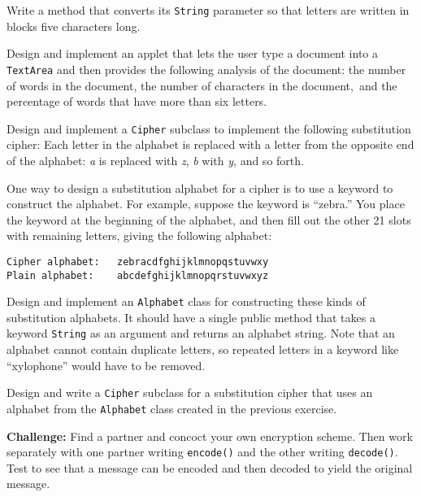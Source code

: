 \begin{EXRtwo}
\noindent Write a method that converts its {\tt String}
parameter so that letters are written in blocks five characters long.

\item  Design and implement an applet that lets the user type a document
into a {\tt TextArea} and then provides the following analysis of the
document: the number of words in the document, the number of
characters in the document,~and the percentage of words that have more
than six letters.

\item  Design and implement a {\tt Cipher} subclass to
implement the following substitution cipher: Each letter in the alphabet
is replaced with a letter from the opposite end of the alphabet:
{\it a} is replaced with {\it z}, {\it b} with {\it y}, and so forth.

\item  One way to design a substitution alphabet for a cipher
is to use a keyword to construct the alphabet.  For example,
suppose the keyword is ``zebra.'' You place the keyword
at the beginning of the alphabet, and then fill out the
other 21 slots with remaining letters, giving the following
alphabet:

\begin{jjjlisting}
\begin{lstlisting}
Cipher alphabet:   zebracdfghijklmnopqstuvwxy
Plain alphabet:    abcdefghijklmnopqrstuvwxyz
\end{lstlisting}
\end{jjjlisting}

\noindent Design and implement an {\tt Alphabet} class for
constructing these kinds of substitution alphabets.  It should have a
single public method that takes a keyword {\tt String} as an argument
and returns an alphabet string.  Note that an alphabet cannot contain
duplicate letters, so repeated letters in a keyword like ``xylophone''
would have to be removed.

\item  Design and write a {\tt Cipher} subclass for a
substitution cipher that uses an alphabet from the {\tt Alphabet}
class created in the previous exercise.

\item  {\bf Challenge:} Find a partner and concoct your own encryption scheme.
Then work separately with one partner writing {\tt encode()} and the
other writing {\tt decode()}. Test to see that a message can be
encoded and then decoded to yield the original message.


\end{EXRtwo}

